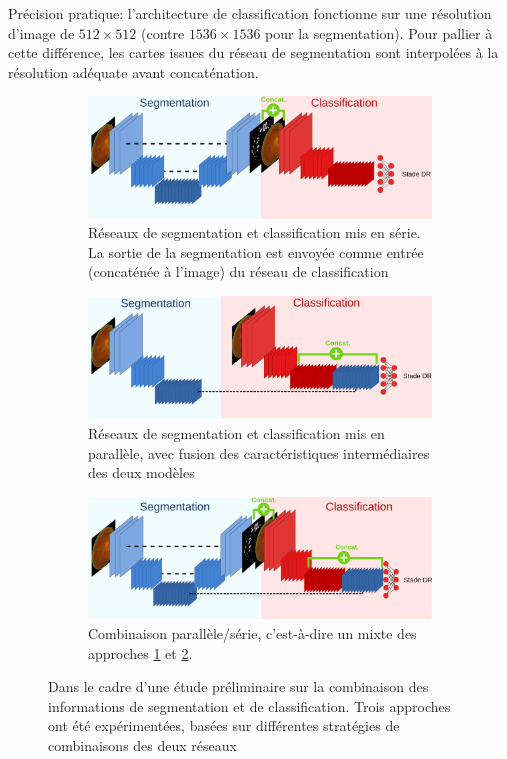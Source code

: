 Précision pratique: l'architecture de classification fonctionne sur une résolution d'image de $512 \times 512$ (contre $1536 \times 1536$ pour la segmentation). Pour pallier à cette différence, les cartes issues du réseau de segmentation sont interpolées à la résolution adéquate avant concaténation.
\begin{figure}
	\centering
	\begin{subfigure}{.7\textwidth}
		\centering
		\includegraphics[width=\linewidth]{gnuplot/segmentation_lesions/gradation_dr/modele_serie}
		\caption{Réseaux de segmentation et classification mis en série. La sortie de la segmentation est envoyée comme entrée (concaténée à l'image) du réseau de classification}
	\label{fig:modeleserie}
	\end{subfigure}
	
	\begin{subfigure}{.7\textwidth}
		\includegraphics[width=\linewidth]{gnuplot/segmentation_lesions/gradation_dr/modele_parallele}
		\caption{Réseaux de segmentation et classification mis en parallèle, avec fusion des caractéristiques intermédiaires des deux modèles}
		\label{fig:modeleparalelle}
	\end{subfigure}
\begin{subfigure}{.7\textwidth}
	\centering
	\includegraphics[width=\linewidth]{gnuplot/segmentation_lesions/gradation_dr/modele_combine}
	\caption{Combinaison parallèle/série, c'est-à-dire un mixte des approches \ref{fig:modeleserie} et \ref{fig:modeleparalelle}.}
	\label{fig:modelecombine}
\end{subfigure}
\caption{Dans le cadre d'une étude préliminaire sur la combinaison des informations de segmentation et de classification. Trois approches ont été expérimentées, basées sur différentes stratégies de combinaisons des deux réseaux}
\label{fig:segClassModel}
\end{figure}
